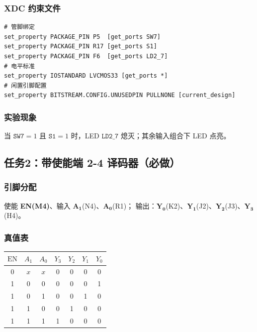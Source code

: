 \documentclass[11pt,a4paper]{article}
\begin{document}
\subsubsection{XDC 约束文件}
\begin{lstlisting}
# 管脚绑定
set_property PACKAGE_PIN P5  [get_ports SW7]
set_property PACKAGE_PIN R17 [get_ports S1]
set_property PACKAGE_PIN F6  [get_ports LD2_7]
# 电平标准
set_property IOSTANDARD LVCMOS33 [get_ports *]
# 闲置引脚配置
set_property BITSTREAM.CONFIG.UNUSEDPIN PULLNONE [current_design]
\end{lstlisting}

\subsubsection{实验现象}
当 $\texttt{SW7}=1$ 且 $\texttt{S1}=1$ 时，LED $\texttt{LD2\_7}$ 熄灭；其余输入组合下 LED 点亮。

\newpage
\subsection{任务2：带使能端 2-4 译码器（必做）}
\subsubsection{引脚分配}
使能 \textbf{EN(M4)}、输入 $\boldsymbol{A_1}$(N4)、$\boldsymbol{A_0}$(R1)；
输出：$\boldsymbol{Y_0}$(K2)、$\boldsymbol{Y_1}$(J2)、$\boldsymbol{Y_2}$(J3)、$\boldsymbol{Y_3}$(H4)。

\subsubsection{真值表}
\begin{table}[htbp]
\centering
\begin{tabular}{ccccccc}
\toprule
$\text{EN}$ & $A_1$ & $A_0$ & $Y_3$ & $Y_2$ & $Y_1$ & $Y_0$ \\
\midrule
0  & $x$  & $x$  & 0  & 0  & 0  & 0  \\
1  & 0  & 0  & 0  & 0  & 0  & 1  \\
1  & 0  & 1  & 0  & 0  & 1  & 0  \\
1  & 1  & 0  & 0  & 1  & 0  & 0  \\
1  & 1  & 1  & 1  & 0  & 0  & 0  \\
\bottomrule
\end{tabular}
\end{table}
\end{document}
